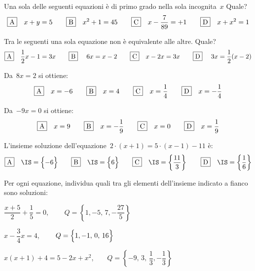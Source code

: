 \begin{esercizio}
\label{ese:13.45}
Una sola delle seguenti equazioni è di primo grado nella sola incognita~\(x\) 
Quale?
\[\fbox{A}\quad x+y=5\qquad\fbox{B}\quad x^{2}+1=45\qquad\fbox{C}\quad 
x-\dfrac{7}{89}=+1\qquad\fbox{D}\quad x+x^{2}=1\]
\end{esercizio}

\begin{esercizio}
\label{ese:13.46}
Tra le seguenti una sola equazione non è equivalente alle altre. Quale?
\[\fbox{A}\quad \dfrac{1}{2}x-1=3x\qquad\fbox{B}\quad~6x=x-2\qquad\fbox{C}\quad 
x-2x=3x\qquad\fbox{D}\quad~3x=\dfrac{1}{2}(x-2)\]
\end{esercizio}

\begin{esercizio}
\label{ese:13.47}
Da~\(8x=2\) si ottiene:
\[\fbox{A}\quad x=-6\qquad\fbox{B}\quad x=4\qquad\fbox{C}\quad 
x=\dfrac{1}{4}\qquad\fbox{D}\quad x=-{\dfrac{1}{4}}\]
\end{esercizio}

\begin{esercizio}
\label{ese:13.48}
Da~\(-9x=0\) si ottiene:
\[\fbox{A}\quad x=9\qquad\fbox{B}\quad x=-{\dfrac{1}{9}}\qquad\fbox{C}\quad 
x=0\qquad\fbox{D}\quad x=\dfrac{1}{9}\]
\end{esercizio}

\begin{esercizio}
\label{ese:13.49}
L'insieme soluzione dell'equazione~\(2\cdot \left(x+1\right)=5\cdot 
\left(x-1\right)-11\) è:
\[\fbox{A}\quad \IS=\Bigl\{-6\Bigr\}\qquad\fbox{B}\quad 
\IS=\Bigl\{6\Bigr\}\qquad\fbox{C}\quad 
\IS=\left\{\dfrac{11}{3}\right\}\qquad\fbox{D}\quad 
\IS=\left\{\dfrac{1}{6}\right\}\]
\end{esercizio}

\begin{esercizio}
\label{ese:13.50}
Per ogni equazione, individua quali tra gli elementi dell'insieme indicato a 
fianco sono soluzioni:
\begin{enumeratea}
\spazielenx
 \item \(\dfrac{x+5}{2}+\dfrac{1}{5}=0\), \(\qquad 
Q=\left\{1,-5,\,7,-\dfrac{27}{5}\right\}\)
 \item \(x-\dfrac{3}{4}x=4\), \(\qquad Q=\Bigl\{1,-1,\,0,\,16\Bigr\}\)
 \item \(x(x+1)+4=5-2x+x^{2}\),\(\qquad 
Q=\left\{-9,\,3,\,\dfrac{1}{3},-\dfrac{1}{3}\right\}\)
\end{enumeratea}
\end{esercizio}


